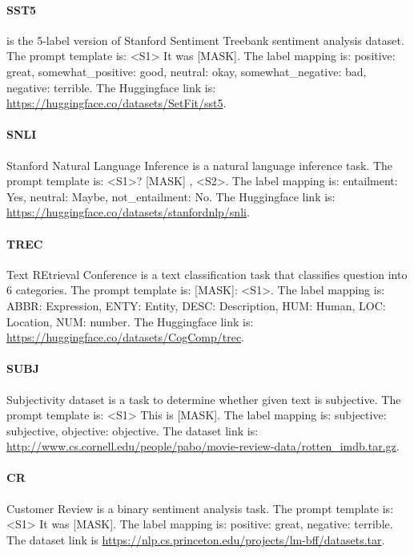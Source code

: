 \paragraph{SST5} is the 5-label version of Stanford Sentiment Treebank \citep{socher2013recursive} sentiment analysis dataset. The prompt template is: \textless{}S1\textgreater{} It was {[}MASK{]}. The label mapping is: positive: great, somewhat\_positive: good, neutral: okay, somewhat\_negative: bad, negative: terrible. The Huggingface link is: \url{https://huggingface.co/datasets/SetFit/sst5}.

\paragraph{SNLI} Stanford Natural Language Inference \citep{bowman2015large} is a natural language inference task. The prompt template is: \textless{}S1\textgreater{}? {[}MASK{]} , \textless{}S2\textgreater{}. The label mapping is: entailment: Yes, neutral: Maybe, not\_entailment: No. The Huggingface link is: \url{https://huggingface.co/datasets/stanfordnlp/snli}.

\paragraph{TREC} Text REtrieval Conference \citep{li2002learning} is a text classification task that classifies question into $6$ categories. The prompt template is: {[}MASK{]}: \textless{}S1\textgreater{}. The label mapping is: ABBR: Expression, ENTY: Entity, DESC: Description, HUM: Human, LOC: Location, NUM: number. The Huggingface link is: \url{https://huggingface.co/datasets/CogComp/trec}.

\paragraph{SUBJ} Subjectivity \citep{pang2004sentimental} dataset is a task to determine whether given text is subjective. The prompt template is: \textless{}S1\textgreater{} This is {[}MASK{]}. The label mapping is: subjective: subjective, objective: objective. The dataset link is: \url{http://www.cs.cornell.edu/people/pabo/movie-review-data/rotten_imdb.tar.gz}.

\paragraph{CR} Customer Review \citep{hu2004mining} is a binary sentiment analysis task. The prompt template is: \textless{}S1\textgreater{} It was {[}MASK{]}. The label mapping is: positive: great, negative: terrible. The dataset link is \url{https://nlp.cs.princeton.edu/projects/lm-bff/datasets.tar}.

